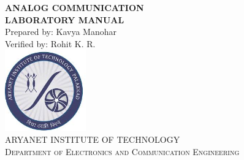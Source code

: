 \begin{titlepage}
\begin{center}
\Large{{\textbf{ANALOG COMMUNICATION\\ LABORATORY MANUAL}}}\\[2cm]
{Prepared by: Kavya Manohar}\\
{Verified by: Rohit K. R.}\\[2cm]
\includegraphics[height=3.5cm,width=3.5cm]{AITlogo.jpg}\\[3cm]
\textsc{\Large {ARYANET INSTITUTE OF TECHNOLOGY}}~\\[.5cm]
{\textsc{\Large {Department of Electronics and Communication Engineering}}}\\
\end{center}
\end{titlepage}
